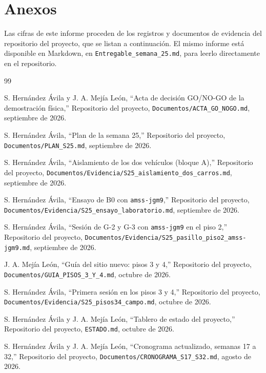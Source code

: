 \documentclass[12pt,letterpaper]{article}
\begin{document}
\section{Anexos}

Las cifras de este informe proceden de los registros y documentos de evidencia del repositorio del proyecto, que se listan a continuación. El mismo informe está disponible en Markdown, en \texttt{Entregable\_semana\_25.md}, para leerlo directamente en el repositorio.

\begin{thebibliography}{99}

S. Hernández Ávila y J. A. Mejía León,
``Acta de decisión GO/NO-GO de la demostración física,''
Repositorio del proyecto, \texttt{Documentos/ACTA\_GO\_NOGO.md}, septiembre de 2026.

S. Hernández Ávila,
``Plan de la semana 25,''
Repositorio del proyecto, \texttt{Documentos/PLAN\_S25.md}, septiembre de 2026.

S. Hernández Ávila,
``Aislamiento de los dos vehículos (bloque A),''
Repositorio del proyecto, \texttt{Documentos/Evidencia/S25\_aislamiento\_dos\_carros.md}, septiembre de 2026.

S. Hernández Ávila,
``Ensayo de B0 con \texttt{amss-jgm9},''
Repositorio del proyecto, \texttt{Documentos/Evidencia/S25\_ensayo\_laboratorio.md}, septiembre de 2026.

S. Hernández Ávila,
``Sesión de G-2 y G-3 con \texttt{amss-jgm9} en el piso 2,''
Repositorio del proyecto, \texttt{Documentos/Evidencia/S25\_pasillo\_piso2\_amss-jgm9.md}, septiembre de 2026.

J. A. Mejía León,
``Guía del sitio nuevo: pisos 3 y 4,''
Repositorio del proyecto, \texttt{Documentos/GUIA\_PISOS\_3\_Y\_4.md}, octubre de 2026.

S. Hernández Ávila,
``Primera sesión en los pisos 3 y 4,''
Repositorio del proyecto, \texttt{Documentos/Evidencia/S25\_pisos34\_campo.md}, octubre de 2026.

S. Hernández Ávila y J. A. Mejía León,
``Tablero de estado del proyecto,''
Repositorio del proyecto, \texttt{ESTADO.md}, octubre de 2026.

S. Hernández Ávila y J. A. Mejía León,
``Cronograma actualizado, semanas 17 a 32,''
Repositorio del proyecto, \texttt{Documentos/CRONOGRAMA\_S17\_S32.md}, agosto de 2026.

\end{thebibliography}
\end{document}

